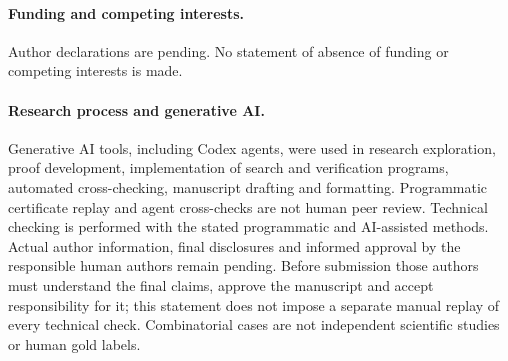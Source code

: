 \documentclass[pdflatex,sn-mathphys-num]{sn-jnl}
\theoremstyle{thmstyleone}
\theoremstyle{thmstylethree}
\theoremstyle{thmstyletwo}
\begin{document}
\paragraph*{Funding and competing interests.}
Author declarations are pending. No statement of absence of funding or competing interests is made.
\paragraph*{Research process and generative AI.}
Generative AI tools, including Codex agents, were used in research exploration, proof development, implementation of search and verification programs, automated cross-checking, manuscript drafting and formatting. Programmatic certificate replay and agent cross-checks are not human peer review. Technical checking is performed with the stated programmatic and AI-assisted methods. Actual author information, final disclosures and informed approval by the responsible human authors remain pending. Before submission those authors must understand the final claims, approve the manuscript and accept responsibility for it; this statement does not impose a separate manual replay of every technical check. Combinatorial cases are not independent scientific studies or human gold labels.
\end{document}
